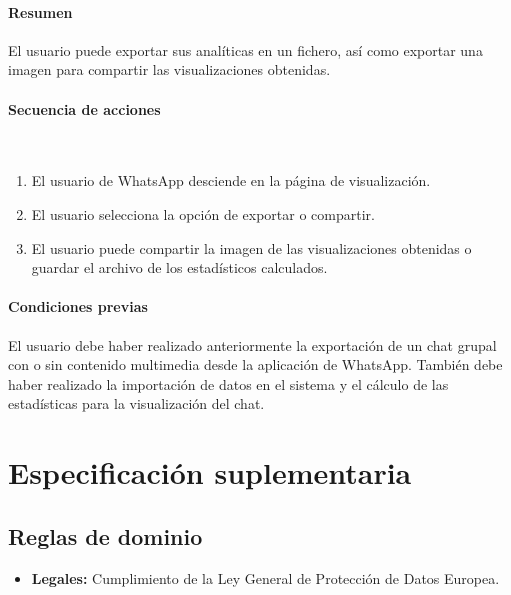 \paragraph{Resumen} El usuario puede exportar sus analíticas en un fichero, así como exportar una imagen para compartir las visualizaciones obtenidas.
\paragraph{Secuencia de acciones}\mbox{}\\

\begin{enumerate}
	\item El usuario de WhatsApp desciende en la página de visualización.
	\item El usuario selecciona la opción de exportar o compartir.
	\item El usuario puede compartir la imagen de las visualizaciones obtenidas o guardar el archivo de los estadísticos calculados.
\end{enumerate}

\paragraph{Condiciones previas} El usuario debe haber realizado anteriormente la exportación de un chat grupal con o sin contenido multimedia desde la aplicación de WhatsApp. También debe haber realizado la importación de datos en el sistema y el cálculo de las estadísticas para la visualización del chat.



\section{Especificación suplementaria}
\label{subsect:suplementary-specification}


\subsection{Reglas de dominio}

\begin{itemize}
	\item \textbf{Legales:} Cumplimiento de la Ley General de Protección de Datos Europea.
\end{itemize}

